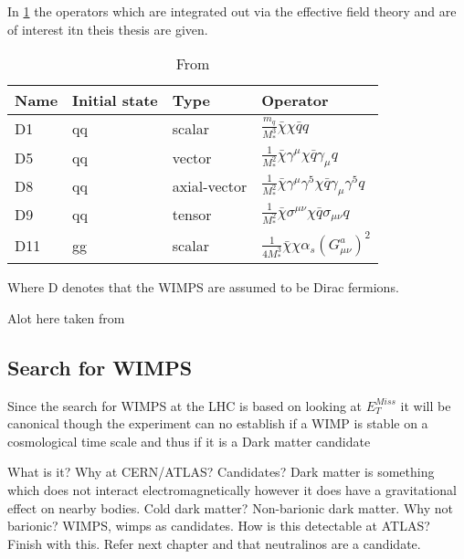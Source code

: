 In \ref{tab:operators} the operators which are integrated out via the effective field theory and are of interest itn theis thesis are given.
\renewcommand{\arraystretch}{1.5} %
\begin{table}[H]
\begin{center}
    \begin{tabular}{ | l | l | l | l |}
    \hline
    Name & Initial state & Type & Operator \\ \hline
  	D1 & qq & scalar & $\frac{m_q}{M^3_*} \bar{\chi} \chi \bar{q} q$ \\ \hline
  	D5 & qq & vector & $\frac{1}{M^2_*} \bar{\chi} \gamma^\mu \chi \bar{q} \gamma_\mu q$ \\ \hline
  	D8 & qq & axial-vector & $\frac{1}{M^2_*}\bar{\chi}\gamma^\mu \gamma^5 \chi \bar{q} \gamma_\mu \gamma^5 q $ \\ \hline
  	D9 & qq & tensor & $\frac{1}{M^2_*} \bar{\chi}\sigma^{\mu \nu} \chi \bar{q} \sigma_{\mu \nu} q  $\\ \hline
  	D11 & gg & scalar & $\frac{1}{4M^3_*}\bar{\chi}\chi \alpha_s (G^a_{\mu \nu})^2 $\\ \hline
  	\end{tabular}

  	\caption{From \citep{CERN-PH-EP-2012-210}}
  	\label{tab:operators}
  	  	\end{center}
    \end{table}
\renewcommand{\arraystretch}{1.0}  %
Where D denotes that the WIMPS are assumed to be Dirac fermions.

Alot here taken from \citep{82.116010}

\subsection{Search for WIMPS}
Since the search for WIMPS at the LHC is based on looking at $E_T^{Miss}$ it will be canonical though the experiment can no establish if a WIMP is stable on a cosmological time scale and thus if it is a Dark matter candidate \citep{CERN-PH-EP-2012-210}


What is it? Why at CERN/ATLAS? Candidates?
Dark matter is something which does not interact electromagnetically however it does have a gravitational effect on nearby bodies.
Cold dark matter?
Non-barionic dark matter. Why not barionic?
WIMPS, wimps as candidates.
How is this detectable at ATLAS? Finish with this. Refer next chapter and that neutralinos are a candidate.


